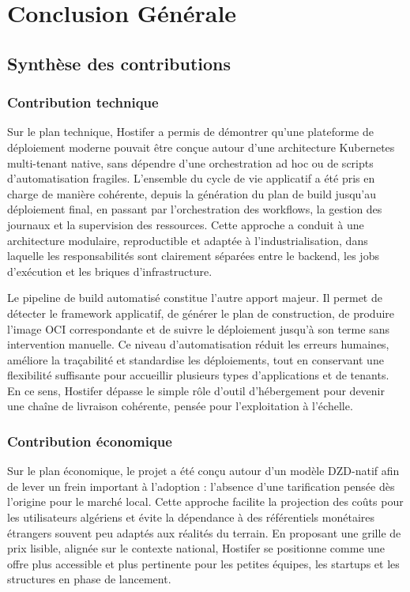 \chapter*{Conclusion Générale}
\label{Conclu}

\section*{Synthèse des contributions}

\subsection*{Contribution technique}

Sur le plan technique, Hostifer a permis de démontrer qu'une plateforme de déploiement moderne pouvait être conçue autour d'une architecture Kubernetes multi-tenant native, sans dépendre d'une orchestration ad hoc ou de scripts d'automatisation fragiles. L'ensemble du cycle de vie applicatif a été pris en charge de manière cohérente, depuis la génération du plan de build jusqu'au déploiement final, en passant par l'orchestration des workflows, la gestion des journaux et la supervision des ressources. Cette approche a conduit à une architecture modulaire, reproductible et adaptée à l'industrialisation, dans laquelle les responsabilités sont clairement séparées entre le backend, les jobs d'exécution et les briques d'infrastructure.

Le pipeline de build automatisé constitue l'autre apport majeur. Il permet de détecter le framework applicatif, de générer le plan de construction, de produire l'image OCI correspondante et de suivre le déploiement jusqu'à son terme sans intervention manuelle. Ce niveau d'automatisation réduit les erreurs humaines, améliore la traçabilité et standardise les déploiements, tout en conservant une flexibilité suffisante pour accueillir plusieurs types d'applications et de tenants. En ce sens, Hostifer dépasse le simple rôle d'outil d'hébergement pour devenir une chaîne de livraison cohérente, pensée pour l'exploitation à l'échelle.

\subsection*{Contribution économique}

Sur le plan économique, le projet a été conçu autour d'un modèle DZD-natif afin de lever un frein important à l'adoption : l'absence d'une tarification pensée dès l'origine pour le marché local. Cette approche facilite la projection des coûts pour les utilisateurs algériens et évite la dépendance à des référentiels monétaires étrangers souvent peu adaptés aux réalités du terrain. En proposant une grille de prix lisible, alignée sur le contexte national, Hostifer se positionne comme une offre plus accessible et plus pertinente pour les petites équipes, les startups et les structures en phase de lancement.

